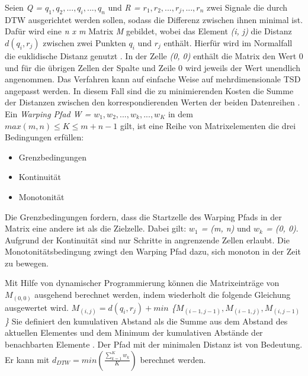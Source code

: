 Seien \emph{Q = $q_{1}, q_{2}, ... , q_{i}, ... , q_{n}$} und \emph{R = $r_{1}, r_{2}, ... , r_{j}, ... , r_{n}$}
zwei Signale die durch \ac{DTW} ausgerichtet werden sollen, sodass die Differenz zwischen ihnen minimal ist.
Dafür wird eine \emph{n x m} Matrix \emph{M} gebildet, wobei das Element \emph{(i, j)} die Distanz \emph{$d(q_{i}, r_{j})$}
zwischen zwei Punkten \emph{$q_{i}$} und \emph{$r_{j}$} enthält.
Hierfür wird im Normalfall die euklidische Distanz genutzt \citep{warren_liao_clustering_2005}.
In der Zelle \emph{(0, 0)} enthält die Matrix den Wert 0
und für die übrigen Zellen der Spalte und Zeile 0 wird jeweils der Wert unendlich angenommen.
Das Verfahren kann auf einfache Weise auf mehrdimensionale \ac{TSD} angepasst werden.
In diesem Fall sind die zu minimierenden Kosten die Summe
der Distanzen zwischen den korrespondierenden Werten der beiden Datenreihen \citep{mohammadzade_dynamic_2021}.
Ein \emph{Warping Pfad} \emph{W = $w_{1}, w_{2}, ... , w_{k}, ... , w_{K}$} in dem \emph{$max(m, n) \le K \le m + n - 1$} gilt,
ist eine Reihe von Matrixelementen die drei Bedingungen erfüllen:
\begin{itemize}
    \item Grenzbedingungen
    \item Kontinuität
    \item Monotonität
\end{itemize}
Die Grenzbedingungen fordern, dass die Startzelle des Warping Pfads in der Matrix eine andere ist als die Zielzelle.
Dabei gilt: \emph{$w_{1}$ = (m, n)} und \emph{$w_{k}$ = (0, 0)}.
Aufgrund der Kontinuität sind nur Schritte in angrenzende Zellen erlaubt.
Die Monotonitätsbedingung zwingt den Warping Pfad dazu, sich monoton in der Zeit zu bewegen.

Mit Hilfe von dynamischer Programmierung können die Matrixeinträge von \emph{$M_{(0, 0)}$} ausgehend berechnet werden,
indem wiederholt die folgende Gleichung ausgewertet wird.
\emph{$ M_{(i, j)} = d(q_{i}, r_{j}) + min $ \{$M_{(i - 1, j - 1)}, M_{(i - 1, j)}, M_{(i, j - 1)} $\}}
Sie definiert den kumulativen Abstand als die Summe aus dem Abstand des aktuellen Elementes
und dem Minimum der kumulativen Abstände der benachbarten Elemente \citep{warren_liao_clustering_2005}.
Der Pfad mit der minimalen Distanz ist von Bedeutung.
Er kann mit \emph{$d_{DTW} = min(\frac{\sum_{k = 1}^{K}w_{k}}{K})$} berechnet werden.


